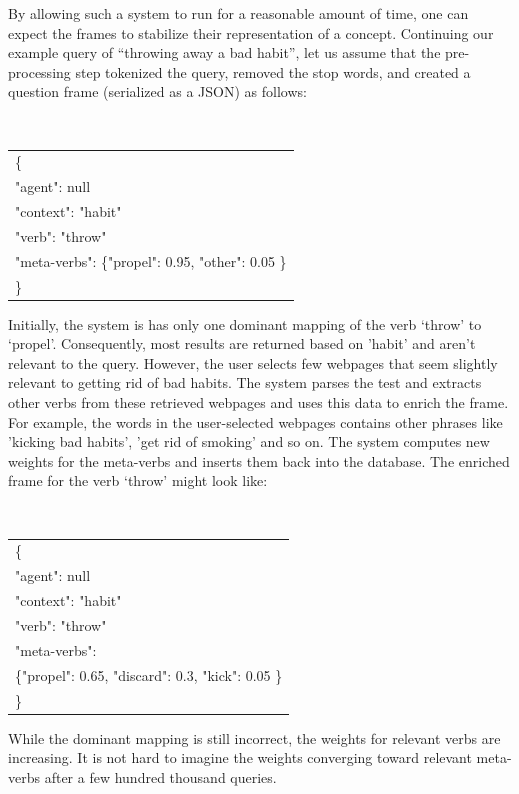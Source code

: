 \documentclass[10pt,letterpaper]{article}
\begin{document}
By allowing such a system to run for a reasonable amount of time, one can expect the frames to stabilize their representation of a concept. Continuing our example query of ``throwing away a bad habit'', let us assume that the pre-processing step tokenized the query, removed the stop words, and created a question frame (serialized as a JSON) as follows:
\begin{center}
    {\tt
        \begin{tabular}{ |l|  }
          \hline
          \{\\
          \quad "agent":  null\\
          \quad "context": "habit"\\
          \quad "verb": "throw"\\
          \quad "meta-verbs": \{"propel": 0.95, "other": 0.05 \} \\
          \}\\
          \hline  
        \end{tabular}
    }
\end{center}
Initially, the system is has only one dominant mapping of the verb `throw' to `propel'. Consequently, most results  are returned based on 'habit' and aren't relevant to the query. However, the user selects few webpages that seem slightly relevant to getting rid of bad habits. The system parses the test and extracts other verbs from these retrieved webpages and uses this data to enrich the frame. For example, the words in the user-selected webpages contains other phrases like 'kicking bad habits', 'get rid of smoking' and so on. The system computes new weights for the meta-verbs and inserts them back into the database. The enriched frame for the verb `throw' might look like:
\begin{center}
    {\tt
        \begin{tabular}{ |l|  }
          \hline
          \{\\
          \quad "agent":  null\\
          \quad "context": "habit"\\
          \quad "verb": "throw"\\
          \quad "meta-verbs":  \\
          \qquad\{"propel": 0.65, "discard": 0.3, "kick": 0.05 \} \\
          \}\\
          \hline  
        \end{tabular}
    }
\end{center}
While the dominant mapping is still incorrect, the weights for relevant verbs are increasing. It is not hard to imagine the weights converging toward relevant meta-verbs after a few hundred thousand queries. 
\end{document}
